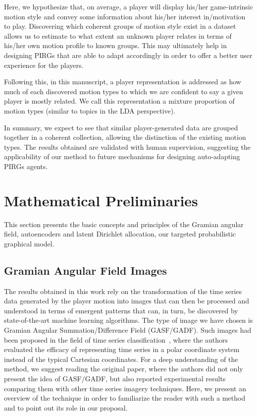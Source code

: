 Here, we hypothesize that, on average, a player will display his/her game-intrinsic motion style and convey some information about his/her interest in/motivation to play. Discovering which coherent groups of motion style exist in a dataset allows us to estimate to what extent an unknown player relates in terms of his/her own motion profile to known groups. This may ultimately help in designing PIRGs that are able to adapt accordingly in order to offer a better user experience for the players.

Following this, in this manuscript, a player representation is addressed as how much of each discovered motion types to which we are confident to say a given player is mostly related. We call this representation a {mixture proportion of motion types} (similar to topics in the LDA perspective). 

In summary, we expect to see that similar player-generated data are grouped together in a coherent collection, allowing the distinction of the existing motion types. The results obtained are validated with human supervision, suggesting the applicability of our method to future mechanisms for designing auto-adapting PIRGs agents.

\section{Mathematical Preliminaries}

This section presents the basic concepts and principles of the Gramian angular field, autoencoders and latent Dirichlet allocation, our targeted probabilistic graphical model.

\subsection{Gramian Angular Field Images}

The results obtained in this work rely on the transformation of the time series data generated by the player motion into images that can then be processed and understood in terms of emergent patterns that can, in turn, be discovered by state-of-the-art machine learning algorithms. The type of image we have chosen is Gramian Angular Summation/Difference Field (GASF/GADF). Such images had been proposed in the field of time series classification~\cite{wang_imaging_2015}, where the authors evaluated the efficacy of representing time series in a polar coordinate system instead of the typical Cartesian coordinates. For a deep understanding of the method, we suggest reading the original paper, where the authors did not only present the idea of GASF/GADF, but also reported experimental results comparing them with other time series imagery techniques. Here, we present an overview of the technique in order to familiarize the reader with such a method and to point out its role in our proposal.

